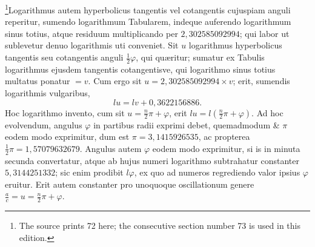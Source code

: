 \footnote{The source prints 72 here; the consecutive section number 73 is used in this edition.}Logarithmus autem hyperbolicus tangentis vel cotangentis cujuspiam anguli reperitur, sumendo logarithmum Tabularem, indeque auferendo logarithmum sinus totius, atque residuum multiplicando per $2{,}302585092994$; qui labor ut sublevetur denuo logarithmis uti conveniet. Sit $u$ logarithmus hyperbolicus tangentis seu cotangentis anguli $\frac12\varphi$, qui quæritur; sumatur ex Tabulis logarithmus ejusdem tangentis cotangentisve, qui logarithmo sinus totius multatus ponatur $=v$. Cum ergo sit $u=2{,}302585092994\times v$; erit, sumendis logarithmis vulgaribus,
\[lu=lv+0{,}3622156886.\]
Hoc logarithmo invento, cum sit $u=\frac n2\pi+\varphi$, erit $lu=l(\frac n2\pi+\varphi)$. Ad hoc evolvendum, angulus $\varphi$ in partibus radii exprimi debet, quemadmodum \& $\pi$ eodem modo exprimitur, dum est $\pi=3{,}1415926535$, ac propterea $\frac12\pi=1{,}57079632679$. Angulus autem $\varphi$ eodem modo exprimitur, si is in minuta secunda convertatur, atque ab hujus numeri logarithmo subtrahatur constanter $5{,}3144251332$; sic enim prodibit $l\varphi$, ex quo ad numeros regrediendo valor ipsius $\varphi$ eruitur. Erit autem constanter pro unoquoque oscillationum genere $\frac ac=u=\frac n2\pi+\varphi$.

